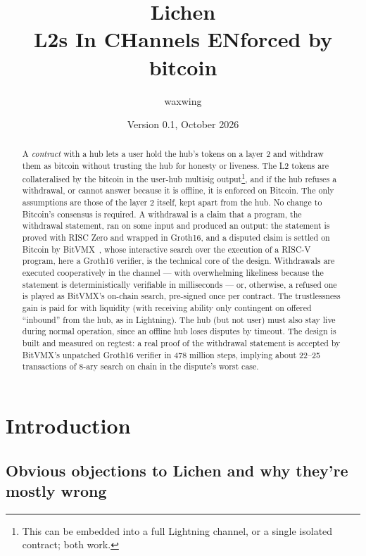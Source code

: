 \documentclass[11pt]{article}
\title{\textbf{Lichen}\\L2s In CHannels ENforced by bitcoin}
\author{waxwing}
\date{Version 0.1, October 2026}
\begin{document}
\maketitle

\begin{abstract}
A \emph{contract} with a hub lets a user hold the hub's tokens on a layer 2 and
withdraw them as bitcoin without trusting the hub for honesty or liveness. The L2 tokens are collateralised by the bitcoin in the user-hub multisig output\footnote{This can be embedded into a full Lightning channel, or a single isolated contract; both work.}, and if the hub refuses a withdrawal, or cannot answer because it is offline, it is enforced on Bitcoin. The only assumptions are those of the layer 2 itself, kept apart from the hub. No change to Bitcoin's
consensus is required. A withdrawal is a claim that a program, the withdrawal statement, ran on some input and produced an output: the statement is proved with RISC Zero and wrapped in Groth16, and a disputed claim is settled on Bitcoin by BitVMX~\cite{bitvmx}, whose interactive search over the execution of a RISC-V program, here a Groth16 verifier, is the technical core of the design.  Withdrawals are executed cooperatively in the channel --- with overwhelming likeliness because the statement is deterministically verifiable in milliseconds --- or, otherwise, a refused one is played as BitVMX's on-chain search, pre-signed once per contract. The trustlessness gain is paid for with liquidity (with receiving ability only contingent on offered ``inbound'' from the hub, as in Lightning). The hub (but not user) must also stay live during normal operation, since an offline hub loses disputes by timeout. The design is built and measured on regtest: a real proof of the withdrawal statement is accepted by BitVMX's unpatched Groth16 verifier in 478 million steps, implying about 22--25 transactions of 8-ary search on chain in the dispute's worst case.
\end{abstract}

\tableofcontents

\section{Introduction}

\subsection{Obvious objections to Lichen and why they're mostly wrong}
\end{document}
